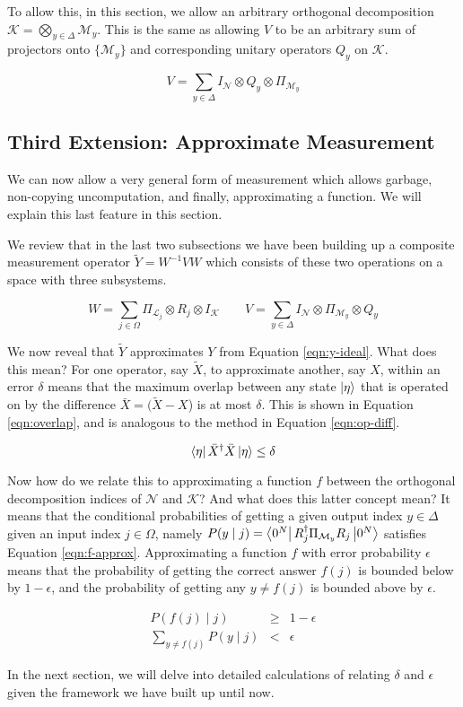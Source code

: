 To allow this, in this section, we allow an arbitrary orthogonal decomposition
$\mathcal{K} = \bigotimes_{y \in \Delta} \mathcal{M}_y$. This is the same as
allowing $V$ to be an arbitrary sum of projectors onto $\{\mathcal{M}_y\}$
and corresponding unitary operators $Q_y$ on $\mathcal{K}$.

\begin{equation}
V = \sum_{y \in \Delta} I_{\mathcal{N}} \otimes Q_y \otimes \Pi_{\mathcal{M}_y}
\end{equation}

\subsection{Third Extension: Approximate Measurement}
\label{subsec:approx}

We can now allow a very general form of
measurement which allows garbage, non-copying uncomputation, and finally,
approximating a function. We will explain this last feature in this section.

We review that in the last two subsections we have been building up a
composite measurement operator $\tilde{Y} = W^{-1}VW$ which consists of 
these two operations on a space with three subsystems.

\begin{equation}
W = \sum_{j \in \Omega} \Pi_{\mathcal{L}_j} \otimes R_j \otimes I_{\mathcal{K}} \qquad
V = \sum_{y \in \Delta} I_{\mathcal{N}} \otimes \Pi_{\mathcal{M}_y} \otimes Q_y
\end{equation}

We now reveal that $\tilde{Y}$ approximates $Y$ from Equation \ref{eqn:y-ideal}.
What does this mean? For one operator, say $\tilde{X}$, to approximate another,
say $X$, within an error $\delta$ means that the maximum overlap between
any state $\left\vert{\eta}\right\rangle$ that is operated on by the difference
$\bar{X} = (\tilde{X} - X$) is at most
$\delta$. This is shown in Equation \ref{eqn:overlap}, and is analogous
to the method in Equation \ref{eqn:op-diff}.

\begin{equation}
\left\langle{\eta}\right\vert \bar{X}^{\dagger} \bar{X} \left\vert{\eta}\right\rangle \le \delta
\label{eqn:overlap}
\end{equation}

Now how do we relate this to approximating a function
$f$ between the orthogonal decomposition indices of $\mathcal{N}$ and 
$\mathcal{K}$? And what does this latter concept mean?
It means that the conditional probabilities of
getting a given output index $y \in \Delta$ given an input index $j \in \Omega$,
namely $P(y \mid j) = \left\langle{0^N}\right\vert R^{\dagger}_j \Pi_{\mathcal{M}_y} R_j \left\vert{0^N}\right\rangle$
satisfies Equation \ref{eqn:f-approx}. Approximating a function $f$ with
error probability $\epsilon$ means that the probability of getting the
correct answer $f(j)$ is bounded below by $1 - \epsilon$, and the probability
of getting any $y \ne f(j)$ is bounded above by $\epsilon$.

\begin{eqnarray}
P(f(j) \mid j) & \ge & 1 - \epsilon \\
\sum_{y \ne f(j)} P(y \mid j) & < & \epsilon
\label{eqn:f-approx}
\end{eqnarray}

In the next section, we will delve into detailed calculations of relating
$\delta$ and $\epsilon$ given the framework we have built up until now.
